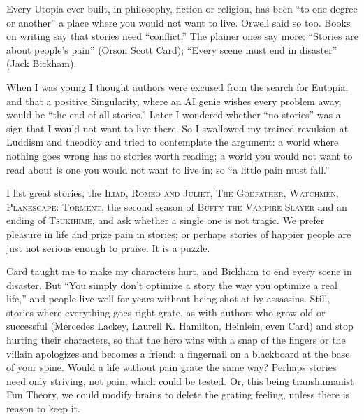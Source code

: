 
Every Utopia ever built, in philosophy, fiction or religion, has been ``to one degree or another'' a place where you would not want to live. Orwell said so too.  Books on writing say that stories need ``conflict.'' The plainer ones say more: ``Stories are about people's pain'' (Orson Scott Card); ``Every scene must end in disaster'' (Jack Bickham). 

When I was young I thought authors were excused from the search for Eutopia, and that a positive Singularity, where an AI genie wishes every problem away, would be ``the end of all stories.'' Later I wondered whether ``no stories'' was a sign that I would not want to live there. So I swallowed my trained revulsion at Luddism and theodicy and tried to contemplate the argument: a world where nothing goes wrong has no stories worth reading; a world you would not want to read about is one you would not want to live in; so ``a little pain must fall.''

I list great stories, the \textsc{Iliad}, \textsc{Romeo and Juliet}, \textsc{The Godfather}, \textsc{Watchmen}, \textsc{Planescape: Torment}, the second season of \textsc{Buffy the Vampire Slayer} and an ending of \textsc{Tsukihime}, and ask whether a single one is not tragic.  We prefer pleasure in life and prize pain in stories; or perhaps stories of happier people are just not serious enough to praise. It is a puzzle. 

Card taught me to make my characters hurt, and Bickham to end every scene in disaster. But ``You simply don't optimize a story the way you optimize a real life,'' and people live well for years without being shot at by assassins. Still, stories where everything goes right grate, as with authors who grow old or successful (Mercedes Lackey, Laurell K. Hamilton, Heinlein, even Card) and stop hurting their characters, so that the hero wins with a snap of the fingers or the villain apologizes and becomes a friend: a fingernail on a blackboard at the base of your spine. Would a life without pain grate the same way? Perhaps stories need only striving, not pain, which could be tested. Or, this being transhumanist Fun Theory, we could modify brains to delete the grating feeling, unless there is reason to keep it. 

